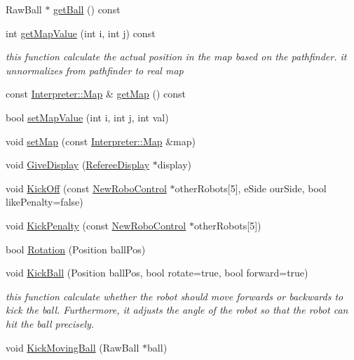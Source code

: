 \begin{DoxyCompactItemize}
\item 
RawBall $\ast$ \hyperlink{classTeamRobot_a86dbc3bbf6fdcebd4ae41a6f68d92a15}{getBall} () const 
\item 
int \hyperlink{classTeamRobot_abc3a5d2d4cac44629a9d8851164b5eda}{getMapValue} (int i, int j) const 
\begin{DoxyCompactList}\small\item\em this function calculate the actual position in the map based on the pathfinder. it unnormalizes from pathfinder to real map \item\end{DoxyCompactList}\item 
const \hyperlink{classMatrix}{Interpreter::Map} \& \hyperlink{classTeamRobot_a8b5fa0d9f42166fc3339ec901fad5a91}{getMap} () const 
\item 
bool \hyperlink{classTeamRobot_a28ee2460e7d465989bb0582782db851e}{setMapValue} (int i, int j, int val)
\item 
void \hyperlink{classTeamRobot_ab8c92b6228aed8eef31d0b1b0fce8690}{setMap} (const \hyperlink{classMatrix}{Interpreter::Map} \&map)
\item 
void \hyperlink{classTeamRobot_a2caa2411b9972fa5caa595f568394ba0}{GiveDisplay} (\hyperlink{classRefereeDisplay}{RefereeDisplay} $\ast$display)
\item 
void \hyperlink{classTeamRobot_a162c8b33d4315a61d8371dc9a923b37b}{KickOff} (const \hyperlink{classNewRoboControl}{NewRoboControl} $\ast$otherRobots\mbox{[}5\mbox{]}, eSide ourSide, bool likePenalty=false)
\item 
void \hyperlink{classTeamRobot_ad5755055df84960c8d1a0a40efe33668}{KickPenalty} (const \hyperlink{classNewRoboControl}{NewRoboControl} $\ast$otherRobots\mbox{[}5\mbox{]})
\item 
bool \hyperlink{classTeamRobot_aa1bb9ac05c067a68118c8646c8d71830}{Rotation} (Position ballPos)
\item 
void \hyperlink{classTeamRobot_a36d006bfeadfcdd37bd1eeb47223bdba}{KickBall} (Position ballPos, bool rotate=true, bool forward=true)
\begin{DoxyCompactList}\small\item\em this function calculate whether the robot should move forwards or backwards to kick the ball. Furthermore, it adjusts the angle of the robot so that the robot can hit the ball precisely. \item\end{DoxyCompactList}\item 
void \hyperlink{classTeamRobot_a98d044ad3907493236b2d399a26cb9ac}{KickMovingBall} (RawBall $\ast$ball)

\end{DoxyCompactItemize}
